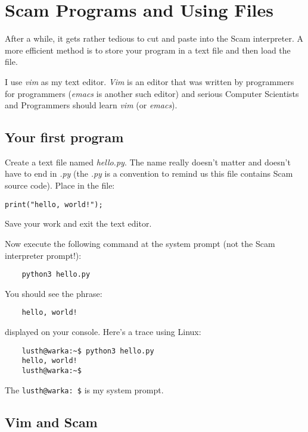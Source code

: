 \chapter{Scam Programs and Using Files}
\label{ScamPrograms}

After a while, it gets rather tedious to
cut and paste into the Scam interpreter.
A more efficient method is to store
your program in a text file and then 
load the file.

I use {\it vim} as my text editor. {\it Vim} is
an editor that was written by programmers
for programmers ({\it emacs} is another such
editor) and serious Computer Scientists
and Programmers should learn {\it vim} (or {\it emacs}).

\section{Your first program}

Create a text file named {\it hello.py}. The
name really doesn't matter and doesn't
have to end in {\it .py} (the {\it .py} is a convention
to remind us this file contains Scam source
code). Place in the file:

\begin{verbatim}
print("hello, world!");
\end{verbatim}

Save your work and exit the text editor.

Now execute the following command at the
system prompt (not the Scam interpreter prompt!):

\begin{verbatim}
    python3 hello.py
\end{verbatim}

You should see the phrase:

\begin{verbatim}
    hello, world!
\end{verbatim}

displayed on your console. Here's a trace using Linux:

\begin{verbatim}
    lusth@warka:~$ python3 hello.py
    hello, world!
    lusth@warka:~$
\end{verbatim}

The {\tt lusth@warka:~\$} is my system prompt.

\section{Vim and Scam}

